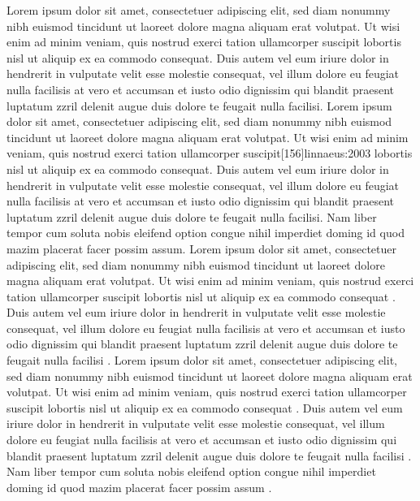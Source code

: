 \documentclass[a4paper,12pt]{scrartcl}
\begin{document}
	{
		{Lorem ipsum dolor sit amet, consectetuer adipiscing elit, sed diam nonummy nibh euismod tincidunt ut laoreet dolore magna aliquam erat volutpat. Ut wisi enim ad minim veniam, quis nostrud exerci tation ullamcorper suscipit lobortis nisl ut aliquip ex ea commodo consequat.\autocite{auler:hiller:2015} Duis autem vel eum iriure dolor in hendrerit in vulputate velit esse molestie consequat, vel illum dolore eu feugiat nulla facilisis at vero et accumsan et iusto odio dignissim qui blandit praesent luptatum zzril delenit augue duis dolore te feugait nulla facilisi.\autocites[68]{auler:hiller:2011}[48]{auler:hiller:2015a}[159--187]{auler:hiller:2015}[40--41]{auler:hiller:2016}[15--23]{tacitus:1981}[19]{de:neck:yoder:1978}[69]{auler:hiller:2011} Lorem ipsum dolor sit amet, consectetuer adipiscing elit, sed diam nonummy nibh euismod tincidunt ut laoreet dolore magna aliquam erat volutpat. Ut wisi enim ad minim veniam, quis nostrud exerci tation ullamcorper suscipit[156]{linnaeus:2003} lobortis nisl ut aliquip ex ea commodo consequat.\autocite{kenmore} Duis autem vel eum iriure dolor in hendrerit in vulputate velit esse molestie consequat, vel illum dolore eu feugiat nulla facilisis at vero et accumsan et iusto odio dignissim qui blandit praesent luptatum zzril delenit augue duis dolore te feugait nulla facilisi.\autocite{kenmore} Nam liber tempor cum soluta nobis eleifend\autocite[41--43]{auler:hiller:2015} option congue nihil imperdiet\autocite[19]{de:neck:yoder:1978} doming id quod mazim placerat facer possim assum.\autocite[145--146]{todorova:et:al:1981}}
		{
			{Lorem ipsum dolor sit amet, consectetuer adipiscing elit, sed diam nonummy nibh euismod tincidunt ut laoreet dolore magna aliquam erat volutpat. Ut wisi enim ad minim veniam, quis nostrud exerci tation ullamcorper suscipit lobortis nisl ut aliquip ex ea commodo consequat \autocite{auler:hiller:2015}. Duis autem vel eum iriure dolor in hendrerit in vulputate velit esse molestie consequat, vel illum dolore eu feugiat nulla facilisis at vero et accumsan et iusto odio dignissim qui blandit praesent luptatum zzril delenit augue duis dolore te feugait nulla facilisi \autocite{auler:hiller:2011,auler:hiller:2015a,auler:hiller:2015,auler:hiller:2016,tacitus:1981,de:neck:yoder:1978}. Lorem ipsum dolor sit amet, consectetuer adipiscing elit, sed diam nonummy nibh euismod tincidunt ut laoreet dolore magna aliquam erat volutpat. Ut wisi enim ad minim veniam, quis nostrud exerci tation ullamcorper suscipit  lobortis nisl ut aliquip ex ea commodo consequat \autocite{kenmore}. Duis autem vel eum iriure dolor in hendrerit in vulputate velit esse molestie consequat, vel illum dolore eu feugiat nulla facilisis at vero et accumsan et iusto odio dignissim qui blandit praesent luptatum zzril delenit augue duis dolore te feugait nulla facilisi \autocite{kenmore}. Nam liber tempor cum soluta nobis eleifend option congue nihil imperdiet doming id quod mazim placerat facer possim assum \autocite{todorova:et:al:1981}.}
			{}%
		}%
	}%
\end{document}
